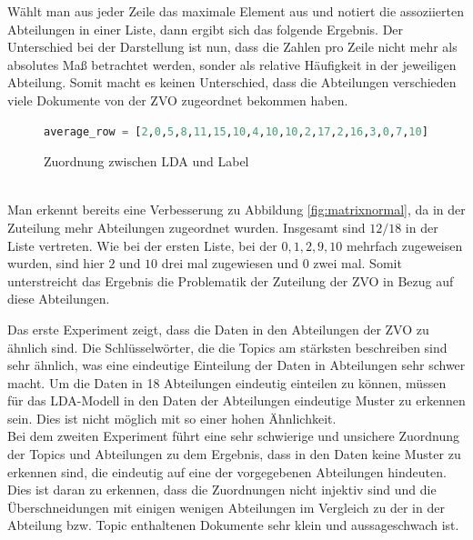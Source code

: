 \documentclass[german,version-2020-11]{uzl-thesis}
\begin{document}
Wählt man aus jeder Zeile das maximale Element aus und notiert die assoziierten Abteilungen in einer Liste, dann ergibt sich das folgende Ergebnis. Der Unterschied bei der Darstellung ist nun, dass die Zahlen pro Zeile nicht mehr als absolutes Maß betrachtet werden, sonder als relative Häufigkeit in der jeweiligen Abteilung. Somit macht es keinen Unterschied, dass die Abteilungen verschieden viele Dokumente von der ZVO zugeordnet bekommen haben. \\

\begin{figure}[h]
\begin{center}
\begin{lstlisting}[language=Python]
average_row = [2,0,5,8,11,15,10,4,10,10,2,17,2,16,3,0,7,10]
\end{lstlisting}
\caption{Zuordnung zwischen LDA und Label} 
\end{center}
\end{figure}\\

Man erkennt bereits eine Verbesserung zu Abbildung \ref{fig:matrixnormal}, da in der Zuteilung mehr Abteilungen zugeordnet wurden. Insgesamt sind $12/18$ in der Liste vertreten. Wie bei der ersten Liste, bei der  $ 0,1,2,9,10 $ mehrfach zugeweisen wurden, sind hier $2$ und $10$ drei mal zugewiesen und $0$ zwei mal. Somit unterstreicht das Ergebnis die Problematik der Zuteilung der ZVO in Bezug auf diese Abteilungen. 


Das erste Experiment zeigt, dass die Daten in den Abteilungen der ZVO zu ähnlich sind. Die Schlüsselwörter, die die Topics am stärksten beschreiben sind sehr ähnlich, was eine eindeutige Einteilung der Daten in Abteilungen sehr schwer macht. Um die Daten in 18 Abteilungen eindeutig einteilen zu können, müssen für das LDA-Modell in den Daten der Abteilungen eindeutige Muster zu erkennen sein. Dies ist nicht möglich mit so einer hohen Ähnlichkeit.\\

Bei dem zweiten Experiment führt eine sehr schwierige und unsichere Zuordnung der Topics und Abteilungen zu dem Ergebnis, dass in den Daten keine Muster zu erkennen sind, die eindeutig auf eine der vorgegebenen Abteilungen hindeuten. Dies ist daran zu erkennen, dass die Zuordnungen nicht injektiv sind und die Überschneidungen mit einigen wenigen Abteilungen im Vergleich zu der in der Abteilung bzw. Topic enthaltenen Dokumente sehr klein und aussageschwach ist.
\end{document}
